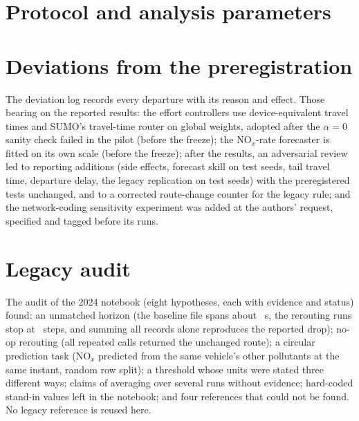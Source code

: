 \documentclass[11pt]{article}
\begin{document}



\appendix
\section{Protocol and analysis parameters}
\begin{table}[h]
\centering\small
\caption{Parameters (from the project configuration and the frozen selection files).}

\end{table}

\section{Deviations from the preregistration}
The deviation log records every departure with its reason and effect. Those bearing on the reported results:
the effort controllers use device-equivalent travel times and SUMO's travel-time router on global weights, adopted
after the $\alpha = 0$ sanity check failed in the pilot (before the freeze); the NO$_x$-rate forecaster is fitted on
its own scale (before the freeze); after the results, an adversarial review led to reporting additions (side effects,
forecast skill on test seeds, tail travel time, departure delay, the legacy replication on test seeds) with the
preregistered tests unchanged, and to a corrected route-change counter for the legacy rule; and the network-coding
sensitivity experiment was added at the authors' request, specified and tagged before its runs.

\section{Legacy audit}
The audit of the 2024 notebook (eight hypotheses, each with evidence and status) found: an unmatched horizon (the
baseline file spans about \LegacyBaselineHorizon~s, the rerouting runs stop at \LegacyControlledSteps~steps, and
summing all records alone reproduces the reported drop); no-op rerouting (all repeated calls returned the unchanged
route); a circular prediction task (NO$_x$ predicted from the same vehicle's other pollutants at the same instant,
random row split); a threshold whose units were stated three different ways; claims of averaging over several runs
without evidence; hard-coded stand-in values left in the notebook; and four references that could not be found. No legacy
reference is reused here.
\end{document}
